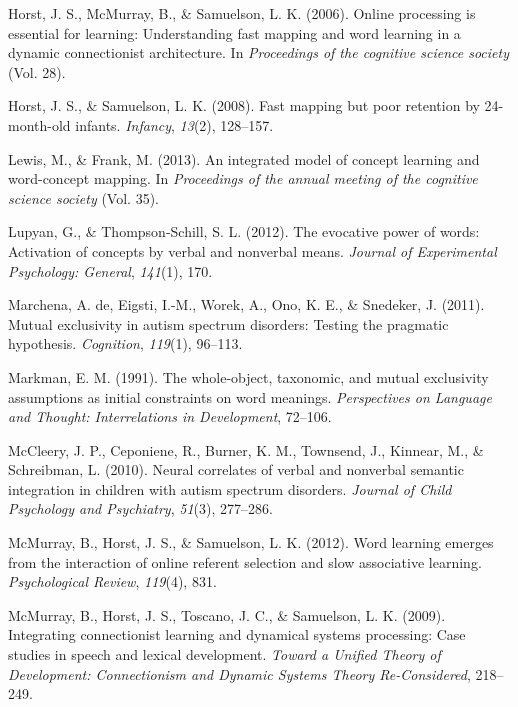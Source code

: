 \documentclass[english,floatsintext,man]{apa6}
\theoremstyle{definition}
\theoremstyle{definition}
\theoremstyle{definition}
\theoremstyle{remark}
\begin{document}
\leavevmode\hypertarget{ref-horst2006online}{}%
Horst, J. S., McMurray, B., \& Samuelson, L. K. (2006). Online
processing is essential for learning: Understanding fast mapping and
word learning in a dynamic connectionist architecture. In
\emph{Proceedings of the cognitive science society} (Vol. 28).

\leavevmode\hypertarget{ref-horst2008fast}{}%
Horst, J. S., \& Samuelson, L. K. (2008). Fast mapping but poor
retention by 24-month-old infants. \emph{Infancy}, \emph{13}(2),
128--157.

\leavevmode\hypertarget{ref-lewis2013integrated}{}%
Lewis, M., \& Frank, M. (2013). An integrated model of concept learning
and word-concept mapping. In \emph{Proceedings of the annual meeting of
the cognitive science society} (Vol. 35).

\leavevmode\hypertarget{ref-lupyan2012evocative}{}%
Lupyan, G., \& Thompson-Schill, S. L. (2012). The evocative power of
words: Activation of concepts by verbal and nonverbal means.
\emph{Journal of Experimental Psychology: General}, \emph{141}(1), 170.

\leavevmode\hypertarget{ref-de2011mutual}{}%
Marchena, A. de, Eigsti, I.-M., Worek, A., Ono, K. E., \& Snedeker, J.
(2011). Mutual exclusivity in autism spectrum disorders: Testing the
pragmatic hypothesis. \emph{Cognition}, \emph{119}(1), 96--113.

\leavevmode\hypertarget{ref-markman1991whole}{}%
Markman, E. M. (1991). The whole-object, taxonomic, and mutual
exclusivity assumptions as initial constraints on word meanings.
\emph{Perspectives on Language and Thought: Interrelations in
Development}, 72--106.

\leavevmode\hypertarget{ref-mccleery2010neural}{}%
McCleery, J. P., Ceponiene, R., Burner, K. M., Townsend, J., Kinnear,
M., \& Schreibman, L. (2010). Neural correlates of verbal and nonverbal
semantic integration in children with autism spectrum disorders.
\emph{Journal of Child Psychology and Psychiatry}, \emph{51}(3),
277--286.

\leavevmode\hypertarget{ref-mcmurray2012word}{}%
McMurray, B., Horst, J. S., \& Samuelson, L. K. (2012). Word learning
emerges from the interaction of online referent selection and slow
associative learning. \emph{Psychological Review}, \emph{119}(4), 831.

\leavevmode\hypertarget{ref-mcmurray2009integrating}{}%
McMurray, B., Horst, J. S., Toscano, J. C., \& Samuelson, L. K. (2009).
Integrating connectionist learning and dynamical systems processing:
Case studies in speech and lexical development. \emph{Toward a Unified
Theory of Development: Connectionism and Dynamic Systems Theory
Re-Considered}, 218--249.
\end{document}
